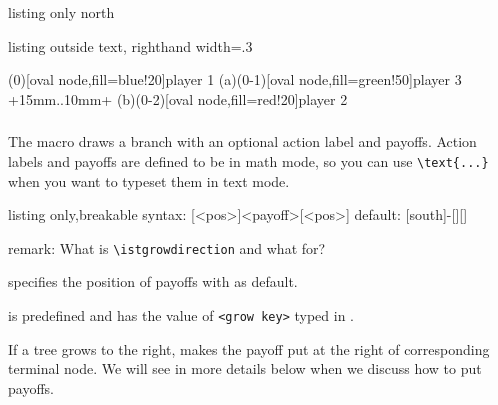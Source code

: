 \begin{tcblisting}{listing only}
    {}{north}    
\end{tcblisting}


\begin{tcblisting}{listing outside text, righthand width=.3\linewidth}
\begin{istgame}
\xtdistance{20mm}{20mm}
\istroot*[right](0)[oval node,fill=blue!20]{player 1}
  \istb  \istb  \endist
{}
\istroot*(a)(0-1)[oval node,fill=green!50]{player 3}%
  +15mm..10mm+
  \istb  \istb  \endist
{}
\istroot*[right](b)(0-2)[oval node,fill=red!20]{player 2}
  \istb  \istb  \endist
\end{istgame}
\end{tcblisting}


\subsubsection*{\cmd{\istb}}

The macro \cmd{\istb} draws a branch with an optional action label and payoffs.
Action labels and payoffs are defined to be in math mode, so you can use \verb|\text{...}| when you want to typeset them in text mode.

\begin{tcblisting}{listing only,breakable}
syntax: [<pos>]{<payoff>}[<pos>]
default: [south]{-}{}[]{}[\istgrowdirection]
\end{tcblisting}


remark: What is \verb|\istgrowdirection| and what for?\par

\quad \cmd{\istgrowdirection} specifies the position of payoffs with  as default.\par
\quad \cmd{\istgrowdirection} is predefined and has the value of \verb|<grow key>| typed in \cmd{\istroot}.\par

If a tree grows to the right, \cmd{\istgrowdirection} makes the payoff put at the right of corresponding terminal node. We will see in more details below when we discuss how to put payoffs.

